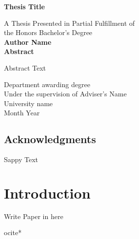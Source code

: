 \documentclass{article}
\begin{document}
\begin{titlepage}
\begin{center}
\vspace{1cm}
\huge
\textbf{Thesis Title}

\LARGE
\vspace{.5cm}
A Thesis Presented in Partial Fulfillment of\\ the Honors Bachelor's Degree\\
\vspace{.5cm}
\textbf{Author Name}\\
\vspace{.5cm}
\Large
\vspace{.5cm}
\Large
\textbf{Abstract}
\end{center}
Abstract Text

\vfill
\begin{center}	
Department awarding degree\\
Under the supervision of Adviser's Name\\
University name\\
Month Year\\
\end{center}
\end{titlepage}
\tableofcontents
\listoffigures
\listoftables
\pagebreak
{}
\begin{center}\section*{Acknowledgments}\end{center}
Sappy Text

\pagebreak
{}
\section{Introduction}
Write Paper in here


\pagebreak
{}


ocite{*}
% 
\end{document}
